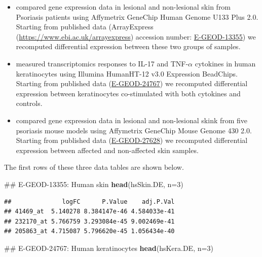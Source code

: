 \documentclass[9pt,a4paper,]{extarticle}
\newenvironment{Shaded}{\begin{snugshade}}{\end{snugshade}}
\newcommand{\KeywordTok}[1]{\textcolor[rgb]{0.13,0.29,0.53}{\textbf{#1}}}
\newcommand{\DataTypeTok}[1]{\textcolor[rgb]{0.13,0.29,0.53}{#1}}
\newcommand{\DecValTok}[1]{\textcolor[rgb]{0.00,0.00,0.81}{#1}}
\newcommand{\NormalTok}[1]{#1}
\theoremstyle{definition}
\theoremstyle{definition}
\theoremstyle{definition}
\theoremstyle{remark}
\begin{document}
\begin{itemize}
\item
  \citet{nair_genome-wide_2009} compared gene expression data in lesional
  and non-lesional skin from Psoriasis patients using
  Affymetrix GeneChip Human Genome U133 Plus 2.0.
  Starting from published data
  (ArrayExpress (\url{https://www.ebi.ac.uk/arrayexpress}) accession number: \href{https://www.ebi.ac.uk/arrayexpress/experiments/E-GEOD-13355/}{E-GEOD-13355})
  we recomputed differential expression between these two groups of samples.
\item
  \citet{chiricozzi_integrative_2011} measured transcriptomics responses
  to IL-17 and TNF-\(\alpha\) cytokines
  in human keratinocytes using Illumina HumanHT-12 v3.0 Expression BeadChips.
  Starting from published data
  (\href{https://www.ebi.ac.uk/arrayexpress/experiments/E-GEOD-24767/}{E-GEOD-24767})
  we recomputed differential expression between keratinocytes
  co-stimulated with both cytokines and controls.
\item
  \citet{swindell_genome-wide_2011} compared gene expression data in lesional
  and non-lesional skink from five psoriasis mouse models using
  Affymetrix GeneChip Mouse Genome 430 2.0.
  Starting from published data
  (\href{https://www.ebi.ac.uk/arrayexpress/experiments/E-GEOD-27628/}{E-GEOD-27628})
  we recomputed differential expression between affected and non-affected
  skin samples.
\end{itemize}

The first rows of these three data tables are shown below.

\begin{Shaded}
\begin{Highlighting}[]
\NormalTok{## E-GEOD-13355: Human skin}
\KeywordTok{head}\NormalTok{(hsSkin.DE, }\DataTypeTok{n=}\DecValTok{3}\NormalTok{)}
\end{Highlighting}
\end{Shaded}

\begin{verbatim}
##              logFC      P.Value    adj.P.Val
## 41469_at  5.140278 8.384147e-46 4.584033e-41
## 232170_at 5.766759 3.293084e-45 9.002469e-41
## 205863_at 4.715087 5.796620e-45 1.056434e-40
\end{verbatim}

\begin{Shaded}
\begin{Highlighting}[]
\NormalTok{## E-GEOD-24767: Human keratinocytes}
\KeywordTok{head}\NormalTok{(hsKera.DE, }\DataTypeTok{n=}\DecValTok{3}\NormalTok{)}
\end{Highlighting}
\end{Shaded}
\end{document}
